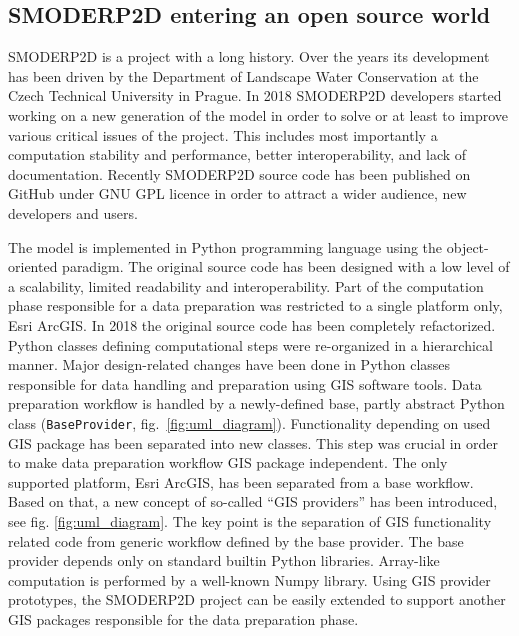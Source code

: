 \subsection{SMODERP2D entering an open source world}\label{ref:open_source_providers}

SMODERP2D is a project with a long history. Over the years its
development has been driven by the Department of Landscape Water
Conservation at the Czech Technical University in Prague. In 2018
SMODERP2D developers started working on a new generation of the model
in order to solve or at least to improve various critical issues of
the project. This includes most importantly a computation stability
and performance, better interoperability, and lack of
documentation. Recently SMODERP2D source code has been published on
GitHub \cite{smoderp2d-github-2019} under GNU GPL licence in order to
attract a wider audience, new developers and users.

The model is implemented in Python programming language using the
object-oriented paradigm. The original source code has been designed
with a low level of a scalability, limited readability and
interoperability. Part of the computation phase responsible for a data
preparation was restricted to a single platform only, Esri ArcGIS. In
2018 the original source code has been completely refactorized. Python
classes defining computational steps were re-organized in a
hierarchical manner. Major design-related changes have been done in
Python classes responsible for data handling and preparation using GIS
software tools. Data preparation workflow is handled by a
newly-defined base, partly abstract Python class ({\tt BaseProvider},
fig.~\ref{fig:uml_diagram}). Functionality depending on used GIS
package has been separated into new classes. This step was crucial in
order to make data preparation workflow GIS package independent. The
only supported platform, Esri ArcGIS, has been separated from a base
workflow. Based on that, a new concept of so-called “GIS providers”
has been introduced, see fig. \ref{fig:uml_diagram}. The key point is
the separation of GIS functionality related code from generic workflow
defined by the base provider. The base provider depends only on
standard builtin Python libraries. Array-like computation is performed
by a well-known Numpy library. Using GIS provider prototypes, the
SMODERP2D project can be easily extended to support another GIS
packages responsible for the data preparation phase. 


